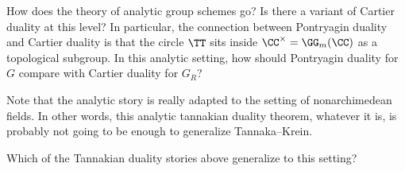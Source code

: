 \documentclass[leqno]{article}
\begin{document}
\begin{qst}
    How does the theory of analytic group schemes go?
    Is there a variant of Cartier duality at this level?
    In particular, the connection between Pontryagin duality
    and Cartier duality is that the circle \(\TT\)
    sits inside \(\CC^{\times} = \GG_m(\CC)\)
    as a topological subgroup.
    In this analytic setting, how should
    Pontryagin duality for \(G\) compare with
    Cartier duality for \(G_R\)?
\end{qst}

Note that the analytic story is really adapted
to the setting of nonarchimedean fields.
In other words, this analytic tannakian duality theorem,
whatever it is,
is probably not going to be enough to generalize Tannaka--Krein.

\begin{qst}
    Which of the Tannakian duality stories above generalize
    to this setting?
\end{qst}
\end{document}
